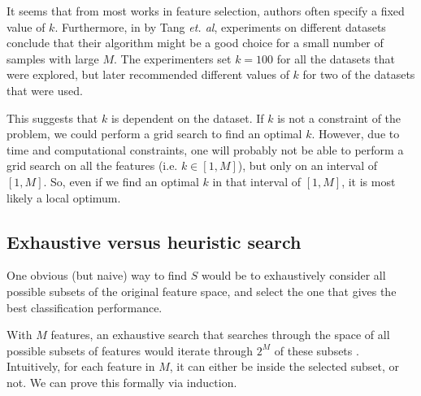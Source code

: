 \documentclass[12pt, twoside, a4paper]{report}
\begin{document}
It seems that from most works in feature selection, authors often specify a fixed value of $k$. Furthermore, in \cite{RefWorks:119} by Tang \textit{et. al}, experiments on different datasets conclude that their algorithm might be a good choice for a small number of samples with large $M$. The experimenters set $k=100$ for all the datasets that were explored, but later recommended different values of $k$ for two of the datasets that were used.

This suggests that $k$ is dependent on the dataset. If $k$ is not a constraint of the problem, we could perform a grid search to find an optimal $k$. However, due to time and computational constraints, one will probably not be able to perform a grid search on all the features (i.e. $k \in [1, M]$), but only on an interval of $[1, M]$. So, even if we find an optimal $k$ in that interval of $[1, M]$, it is most likely a local optimum.


\subsection{Exhaustive versus heuristic search} \label{bg:fs:exhaustive}

One obvious (but naive) way to find $S$ would be to exhaustively consider all possible subsets of the original feature space, and select the one that gives the best classification performance.

With $M$ features, an exhaustive search that searches through the space of all possible subsets of features would iterate through $2^M$ of these subsets \cite{RefWorks:182}. Intuitively, for each feature in $M$, it can either be inside the selected subset, or not. We can prove this formally via induction.
\end{document}
